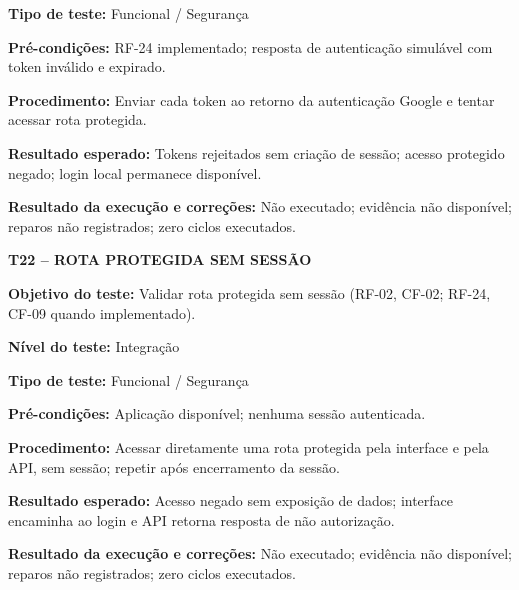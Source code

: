 \noindent\textbf{Tipo de teste:} Funcional / Segurança

\noindent\textbf{Pré-condições:} RF-24 implementado; resposta de autenticação simulável com token inválido e expirado.

\noindent\textbf{Procedimento:} Enviar cada token ao retorno da autenticação Google e tentar acessar rota protegida.

\noindent\textbf{Resultado esperado:} Tokens rejeitados sem criação de sessão; acesso protegido negado; login local permanece disponível.

\noindent\textbf{Resultado da execução e correções:} Não executado; evidência não disponível; reparos não registrados; zero ciclos executados.

\textbf{T22 -- ROTA PROTEGIDA SEM SESSÃO}

\noindent\textbf{Objetivo do teste:} Validar rota protegida sem sessão (RF-02, CF-02; RF-24, CF-09 quando implementado).

\noindent\textbf{Nível do teste:} Integração

\noindent\textbf{Tipo de teste:} Funcional / Segurança

\noindent\textbf{Pré-condições:} Aplicação disponível; nenhuma sessão autenticada.

\noindent\textbf{Procedimento:} Acessar diretamente uma rota protegida pela interface e pela API, sem sessão; repetir após encerramento da sessão.

\noindent\textbf{Resultado esperado:} Acesso negado sem exposição de dados; interface encaminha ao login e API retorna resposta de não autorização.

\noindent\textbf{Resultado da execução e correções:} Não executado; evidência não disponível; reparos não registrados; zero ciclos executados.

